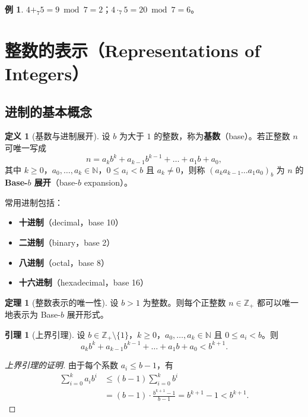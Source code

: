 \documentclass[UTF8,11pt,a4paper]{ctexbook}   %
\theoremstyle{definition}
\newtheorem{definition}{定义}[section]
\newtheorem{theorem}{定理}[section]
\newtheorem{example}{例}[section]
\newtheorem{lemma}{引理}[section]
\begin{document}
\begin{example}
$4+_7 5 = 9\bmod 7 = 2$；\quad $4\cdot_7 5 = 20\bmod 7 = 6$。
\end{example}

\section{整数的表示（Representations of Integers）}

\subsection{进制的基本概念}

\begin{definition}[基数与进制展开]
设 $b$ 为大于 $1$ 的整数，称为\textbf{基数}（base）。若正整数 $n$ 可唯一写成
\[
n = a_k b^k + a_{k-1}b^{k-1} + \dots + a_1 b + a_0,
\]
其中 $k\ge 0$，$a_0,\dots,a_k\in\mathbb{N}$，$0\le a_i < b$ 且 $a_k\neq 0$，则称 $(a_k a_{k-1}\dots a_1 a_0)_b$ 为 $n$ 的\textbf{Base-$b$ 展开}（base-$b$ expansion）。
\end{definition}

常用进制包括：
\begin{itemize}
    \item \textbf{十进制}（decimal，base 10）
    \item \textbf{二进制}（binary，base 2）
    \item \textbf{八进制}（octal，base 8）
    \item \textbf{十六进制}（hexadecimal，base 16）
\end{itemize}

\begin{theorem}[整数表示的唯一性]
设 $b>1$ 为整数。则每个正整数 $n\in\mathbb{Z}_+$ 都可以唯一地表示为 Base-$b$ 展开形式。
\end{theorem}

\begin{lemma}[上界引理]
设 $b\in\mathbb{Z}_+\setminus\{1\}$，$k\ge 0$，$a_0,\dots,a_k\in\mathbb{N}$ 且 $0\le a_i < b$。则
\[
a_k b^k + a_{k-1}b^{k-1} + \dots + a_1 b + a_0 < b^{k+1}.
\]
\end{lemma}

\begin{proof}[上界引理的证明]
由于每个系数 $a_i \le b-1$，有
\begin{align*}
\sum_{i=0}^k a_i b^i &\le (b-1)\sum_{i=0}^k b^i \\
&= (b-1)\cdot\frac{b^{k+1}-1}{b-1} = b^{k+1}-1 < b^{k+1}.
\end{align*}
\end{proof}
\end{document}
